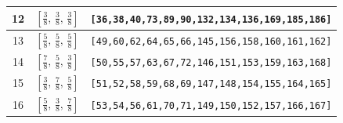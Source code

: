 \documentclass[fleqn,8pt]{jsarticle}
\begin{document}
\begin{longtable}{ccc}
12 & $\left[ \frac{3}{8},\, \frac{3}{8},\, \frac{3}{8} \right]$ & {\tt [36,38,40,73,89,90,132,134,136,169,185,186]} \\ \hline
13 & $\left[ \frac{5}{8},\, \frac{5}{8},\, \frac{5}{8} \right]$ & {\tt [49,60,62,64,65,66,145,156,158,160,161,162]} \\ \hline
14 & $\left[ \frac{7}{8},\, \frac{5}{8},\, \frac{3}{8} \right]$ & {\tt [50,55,57,63,67,72,146,151,153,159,163,168]} \\ \hline
15 & $\left[ \frac{3}{8},\, \frac{7}{8},\, \frac{5}{8} \right]$ & {\tt [51,52,58,59,68,69,147,148,154,155,164,165]} \\ \hline
16 & $\left[ \frac{5}{8},\, \frac{3}{8},\, \frac{7}{8} \right]$ & {\tt [53,54,56,61,70,71,149,150,152,157,166,167]} \\
\end{longtable}
\renewcommand{\arraystretch}{1.2}
\end{document}
